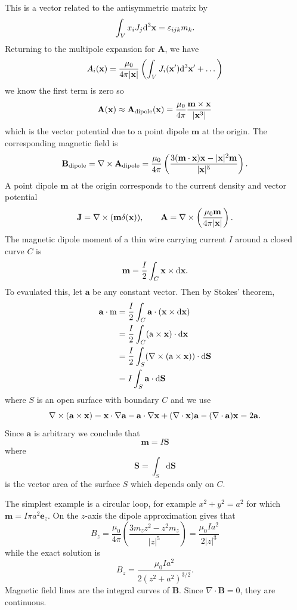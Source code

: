 \documentclass{article}
\begin{document}
This is a vector related  to the antisymmetric matrix by
\[
	\int_V x_iJ_j\mathrm d^3 \mathbf{x} = \varepsilon_{ijk} m_k.
\]
Returning to the multipole expansion for $ \mathbf A $, we have
\[
	A_i(\mathbf{x})=\frac{\mu_0}{4\pi |\mathbf{x}|}\left(\int_V J_i(\mathbf{x}')\mathrm d^3\mathbf{x}'+\dots \right)
\]
we know the first term is zero so
\[
\mathbf A(\mathbf{x}) \approx \mathbf A_{\text{dipole}} (\mathbf{x}) = \frac{\mu_0}{4\pi}\frac{\mathbf m \times \mathbf{x}}{|\mathbf{x}^3|}
\]
which is the vector potential due to a point dipole $ \mathbf m $ at the origin. The corresponding magnetic field is
\[\mathbf B_{\text{dipole}} = \nabla\times\mathbf A_{\text{dipole}} = \frac{\mu_0}{4\pi}\left(\frac{3(\mathbf m\cdot\mathbf{x})\mathbf{x}-|\mathbf{x}|^2\mathbf m}{|\mathbf{x}|^5}\right). \]
A point dipole $ \mathbf m $ at the origin corresponds to the current density and vector potential
\[
	\mathbf J = \nabla\times(\mathbf m\delta(\mathbf{x})),\qquad \mathbf A = \nabla\times\left(\frac{\mu_0 \mathbf m}{4\pi |\mathbf{x}|}\right).
\]
The magnetic dipole moment of a thin wire carrying current $ I $ around a closed curve $ C $ is
\[
	\mathbf m = \frac{I}2 \int_C \mathbf{x}\times \mathrm d\mathbf{x}.
\]
To evaulated this, let $ \mathbf a $ be any constant vector. Then by Stokes' theorem,
\begin{align*}
	\mathbf a \cdot\mathrm m &= \frac I2\int_C\mathbf a\cdot(\mathbf{x}\times \mathrm d\mathbf{x})\\
  &= \frac I2\int_C(\mathrm a \times \mathbf{x})\cdot\mathrm d\mathbf{x}\\
	&= \frac I2 \int_S(\nabla\times (\mathrm a \times \mathbf{x}))\cdot\mathrm d\mathbf S\\
  &= I\int_S \mathbf a\cdot\mathrm d\mathbf S
\end{align*}
where $ S $ is an open surface with boundary $ C $ and we use
\[
  \nabla\times(\mathbf a \times \mathbf{x}) = \mathbf{x}\cdot \nabla\mathbf a - \mathbf a \cdot\nabla \mathbf{x} + (\nabla\cdot\mathbf{x})\mathbf a - (\nabla\cdot\mathbf a)\mathbf{x} = 2\mathbf a.
\]
Since $ \mathbf a $ is arbitrary we conclude that
\[
  \mathbf m = I\mathbf S
\]
where
\[
  \mathbf S = \int_S\mathrm d\mathbf S
\]
is the vector area of the surface $ S $ which depends only on $ C $.
\par
The simplest example is a circular loop, for example $ x^2+y^2 = a^2 $ for which $ \mathbf m = I \pi a^2 \mathbf e_z $. On the $ z $-axis the dipole approximation gives that
\[
	B_z = \frac{\mu_0}{4\pi}\left(\frac{3m_zz^2 - z^2m_z}{|z|^5}\right) = \frac{\mu_0 Ia^2}{2|z|^3}
\]
while the exact solution is
\[
	B_z = \frac{\mu_0 Ia^2}{2(z^2+a^2)^{3/2}}.
\]
Magnetic field lines are the integral curves of $ \mathbf B $. Since $ \nabla\cdot\mathbf B = 0 $, they are continuous.
\end{document}
